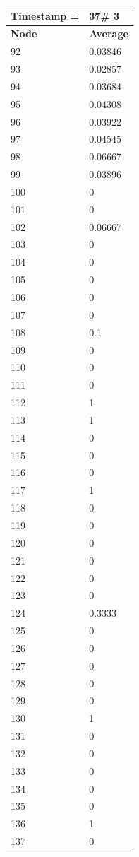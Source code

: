 \begin{tabular}{|l||l|}
\hline
\textbf{Timestamp =} & \textbf{37}\# 3\\\hline
	\textbf{Node} & \textbf{Average} \\ \hline
\hline
	92 & 0.03846 \\ \hline
	93 & 0.02857 \\ \hline
	94 & 0.03684 \\ \hline
	95 & 0.04308 \\ \hline
	96 & 0.03922 \\ \hline
	97 & 0.04545 \\ \hline
	98 & 0.06667 \\ \hline
	99 & 0.03896 \\ \hline
	100 & 0 \\ \hline
	101 & 0 \\ \hline
	102 & 0.06667 \\ \hline
	103 & 0 \\ \hline
	104 & 0 \\ \hline
	105 & 0 \\ \hline
	106 & 0 \\ \hline
	107 & 0 \\ \hline
	108 & 0.1 \\ \hline
	109 & 0 \\ \hline
	110 & 0 \\ \hline
	111 & 0 \\ \hline
	112 & 1 \\ \hline
	113 & 1 \\ \hline
	114 & 0 \\ \hline
	115 & 0 \\ \hline
	116 & 0 \\ \hline
	117 & 1 \\ \hline
	118 & 0 \\ \hline
	119 & 0 \\ \hline
	120 & 0 \\ \hline
	121 & 0 \\ \hline
	122 & 0 \\ \hline
	123 & 0 \\ \hline
	124 & 0.3333 \\ \hline
	125 & 0 \\ \hline
	126 & 0 \\ \hline
	127 & 0 \\ \hline
	128 & 0 \\ \hline
	129 & 0 \\ \hline
	130 & 1 \\ \hline
	131 & 0 \\ \hline
	132 & 0 \\ \hline
	133 & 0 \\ \hline
	134 & 0 \\ \hline
	135 & 0 \\ \hline
	136 & 1 \\ \hline
	137 & 0 \\ \hline
\end{tabular}

